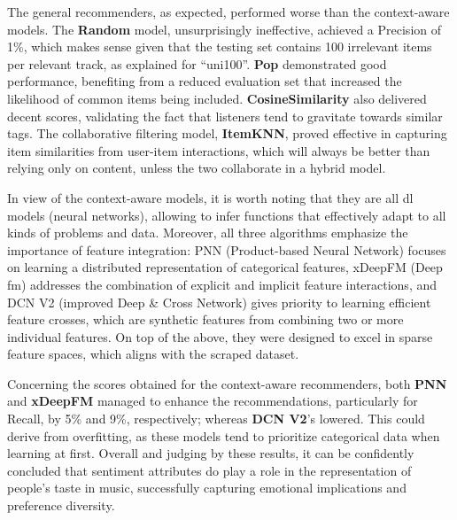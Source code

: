 The general recommenders, as expected, performed worse than the context-aware models. The \textbf{Random} model, unsurprisingly ineffective, achieved a Precision of 1\%, which makes sense given that the testing set contains 100 irrelevant items per relevant track, as explained for ``uni100''. \textbf{Pop} demonstrated good performance, benefiting from a reduced evaluation set that increased the likelihood of common items being included. \textbf{CosineSimilarity} also delivered decent scores, validating the fact that listeners tend to gravitate towards similar tags. The collaborative filtering model, \textbf{ItemKNN}, proved effective in capturing item similarities from user-item interactions, which will always be better than relying only on content, unless the two collaborate in a hybrid model.

In view of the context-aware models, it is worth noting that they are all \acl{dl} models (neural networks), allowing to infer functions that effectively adapt to all kinds of problems and data. Moreover, all three algorithms emphasize the importance of feature integration: PNN (Product-based Neural Network) focuses on learning a distributed representation of categorical features, xDeepFM (Deep \acl{fm}) addresses the combination of explicit and implicit feature interactions, and DCN V2 (improved Deep \& Cross Network) gives priority to learning efficient feature crosses, which are synthetic features from combining two or more individual features. On top of the above, they were designed to excel in sparse feature spaces, which aligns with the scraped dataset.

Concerning the scores obtained for the context-aware recommenders, both \textbf{PNN} and \textbf{xDeepFM} managed to enhance the recommendations, particularly for Recall, by 5\% and 9\%, respectively; whereas \textbf{DCN V2}'s lowered. This could derive from overfitting, as these models tend to prioritize categorical data when learning at first. Overall and judging by these results, it can be confidently concluded that sentiment attributes do play a role in the representation of people's taste in music, successfully capturing emotional implications and preference diversity.